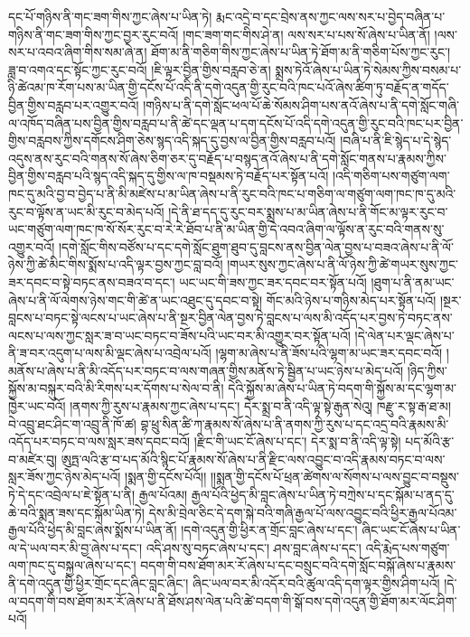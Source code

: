 དང་པོ་གཉིས་ནི་གང་ཟག་གིས་ཀྱང་ཞེས་པ་ཡིན་ཏེ། རྨང་འདྲེ་བ་དང་བྲེས་ནས་ཀྱང་ལས་སར་པ་བྱེད་བཞིན་པ་གཉིས་ནི་གང་ཟག་གིས་ཀྱང་བྱར་རུང་བའོ། །གང་ཟག་གང་གིས་ཤེ་ན། ལས་སར་པ་པས་སོ་ཞེས་པ་ཡིན་ནོ། །ལས་སར་པ་འབའ་ཞིག་གིས་སམ་ཞེ་ན། ཐོག་མ་ནི་གཅིག་གིས་ཀྱང་ཞེས་པ་ཡིན་ཏེ་ཐོག་མ་ནི་གཅིག་པོས་ཀྱང་རུང་། ཟླ་བ་འགའ་དང་སྟོང་ཀྱང་རུང་བའོ། །ཇི་ལྟར་བྱིན་གྱིས་བརླབ་ཅེ་ན། སྨྲས་ཏེའོ་ཞེས་པ་ཡིན་ཏེ་སེམས་ཀྱིས་བསམ་པ་ཉི་ཚེའམ་ཁ་རོག་པས་མ་ཡིན་གྱི་དངོས་པོ་འདི་ནི་དགེ་འདུན་གྱི་རུང་བའི་ཁང་པའོ་ཞེས་ཚིག་ཏུ་བརྗོད་ན་གདོད་བྱིན་གྱིས་བརླབ་པར་འགྱུར་བའོ། །གཉིས་པ་ནི་དགེ་སློང་ཕལ་པོ་ཆེ་སོམས་ཤིག་པས་ནའོ་ཞེས་པ་ནི་དགེ་སློང་གཞི་ལ་འཁོད་བཞིན་པས་བྱིན་གྱིས་བརླབ་པ་ནི་ཚེ་དང་ལྡན་པ་དག་དངོས་པོ་འདི་དགེ་འདུན་གྱི་རུང་བའི་ཁང་པར་བྱིན་གྱིས་བརླབས་ཀྱིས་དགོངས་ཤིག་ཅེས་སྙད་འདི་སྐད་དུ་བྱས་ལ་བྱིན་གྱིས་བརླབ་པའོ། །བཞི་པ་ནི་ཇི་སྙེད་པ་དེ་སྙེད་འདུས་ནས་རུང་བའི་གནས་སོ་ཞེས་ཅིག་ཅར་དུ་བརྗོད་པ་བསྙད་ནའོ་ཞེས་པ་ནི་དགེ་སློང་གནས་པ་རྣམས་ཀྱིས་བྱིན་གྱིས་བརླབ་པའི་སྙད་འདི་སྐད་དུ་གྱིས་ལ་ཁ་བསྡམས་ཏེ་བརྗོད་པར་སྟོན་པའོ། །འདི་གཅིག་པས་གཙུག་ལག་ཁང་དུ་མའི་བྱ་བ་བྱེད་པ་ནི་མི་མཛེས་པ་མ་ཡིན་ཞེས་པ་ནི་རུང་བའི་ཁང་པ་གཅིག་ལ་གཙུག་ལག་ཁང་ཁ་དུ་མའི་རུང་བ་ལྟོས་ན་ཡང་མི་རུང་བ་མེད་པའོ། །དེ་ནི་ཐ་དད་དུ་རུང་བར་སྨྲས་པ་མ་ཡིན་ཞེས་པ་ནི་གོང་མ་ལྟར་རུང་བ་ཡང་གཙུག་ལག་ཁང་ཁ་སོ་སོར་རུང་བ་རེ་རེ་ཐོབ་པ་ནི་མ་ཡིན་གྱི་དེ་འབའ་ཞིག་ལ་ལྟོས་ན་རུང་བའི་གནས་སུ་འགྱུར་བའོ། །དགེ་སློང་གིས་བཙོས་པ་དང་དགེ་སློང་ཐུག་ཐུབ་དུ་བླངས་ནས་བྱིན་ལེན་བྱས་པ་བཟའ་ཞེས་པ་ནི་ལོ་ཉེས་ཀྱི་ཚེ་མིང་གིས་སྨོས་པ་འདི་ལྟར་བྱས་ཀྱང་བླ་བའོ། །གཡར་སུས་ཀྱང་ཞེས་པ་ནི་ལོ་ཉེས་ཀྱི་ཚེ་གཡར་སུས་ཀྱང་ཟར་དབང་བ་སྟེ་བཏང་ནས་བཟའ་བ་དང་། ཡང་ཡང་གི་ཟས་ཀྱང་ཟར་དབང་བར་སྟོན་པའོ། །ཐུག་པ་ནི་ནམ་ཡང་ཞེས་པ་ནི་ལོ་ལེགས་ཉེས་གང་གི་ཚེ་ན་ཡང་འཐུང་དུ་དབང་བ་སྟེ། གོང་མའི་ཉེས་པ་གཉིས་མེད་པར་སྟོན་པའོ། །སྔར་བླངས་པ་བཏང་སྟེ་ལངས་པ་ཡང་ཞེས་པ་ནི་སྔར་བྱིན་ལེན་བྱས་ཏེ་བླངས་པ་ལས་མི་འདོད་པར་བྱས་ཏེ་བཏང་ནས་ལངས་པ་ལས་ཀྱང་སླར་ཟ་བ་ཡང་བཏང་བ་ཟོས་པའི་ཡང་བར་མི་འགྱུར་བར་སྟོན་པའོ། །དེ་ལེན་པར་ལྡང་ཞེས་པ་ནི་ཟ་བར་འདུག་པ་ལས་མི་ལྡང་ཞེས་པ་འབྲེལ་པའོ། །ལྷག་མ་ཞེས་པ་ནི་ཟོས་པའི་ལྷག་མ་ཡང་ཟར་དབང་བའོ། །མནོས་པ་ཞེས་པ་ནི་མི་འདོད་པར་བཏང་བ་ལས་གཞན་གྱིས་མནོས་ཏེ་སྦྱིན་པ་ཡང་ཉེས་པ་མེད་པའོ། །ཉིད་ཀྱིས་སྐྱོས་མ་བསྐུར་བའི་མི་རིགས་པར་དོགས་པ་སེལ་བ་ནི། དེའི་སྐྱོས་མ་ཞེས་པ་ཡིན་ཏེ་བདག་གི་སྐྱོས་མ་དང་ལྷག་མ་ཁྱེར་ཡང་བའོ། །ནགས་ཀྱི་རུས་པ་རྣམས་ཀྱང་ཞེས་པ་དང་། དེར་སྨྲ་བ་ནི་འདི་ལྟ་སྟེ་རྒུན་སེའུ། ཁརྫུ་ར་སྟ་རྒ་ཐ་མ། བེ་འབྲུ་ཐང་ཤིང་ག་འབྲུ་ནི་ཁོ་ཚ། བྷ་ཕྲུ་སིན་ཚི་ཀ་རྣམས་སོ་ཞེས་པ་ནི་ནགས་ཀྱི་རུས་པ་དང་འདྲ་བའི་རྣམས་མི་འདོད་པར་བཏང་བ་ལས་སླར་ཟས་དབང་བའོ། །རྫིང་གི་ཡང་ངོ་ཞེས་པ་དང་། དེར་སྨ་བ་ནི་འདི་ལྟ་སྟེ། པད་མོའི་རྩ་བ་མཛེར་བུ། ཨུཏྤ་ལའི་རྩ་བ་པད་མོའི་སྙིང་པོ་རྣམས་སོ་ཞེས་པ་ནི་རྫིང་ལས་འབྱུང་བ་འདི་རྣམས་བཏང་བ་ལས་སླར་ཟོས་ཀྱང་ཉེས་མེད་པའོ། །སྨན་གྱི་དངོས་པོའོ།། །།སྨན་གྱི་དངོས་པོ་ཕྲན་ཚེགས་ལ་སོགས་པ་ལས་བྱུང་བ་བསྡུས་ཏེ་དེ་དང་འབྲེལ་པ་ཇེ་སྟོན་པ་ནི། རྒྱལ་པོའམ། རྒྱལ་པོའི་ཕྱེད་མི་བླང་ཞེས་པ་ཡིན་ཏེ་བཀྲེས་པ་དང་སྐོམ་པ་ནད་དུ་ཆེ་བའི་སྨན་ཟས་དང་སྐོམ་ཡིན་ཏེ། དེས་མི་བྲེལ་ཅིང་དེ་དག་སྐེ་བའི་གཞི་རྒྱལ་པོ་ལས་འབྱུང་བའི་ཕྱིར་རྒྱལ་པོའམ་རྒྱལ་པོའི་ཕྱེད་མི་བླང་ཞེས་སྨོས་པ་ཡིན་ནོ། །དགེ་འདུན་གྱི་ཕྱིར་ན་གྲོང་བླང་ཞེས་པ་དང་། ཞིང་ཡང་ངོ་ཞེས་པ་ཡིན་ལ་དེ་ཡལ་བར་མི་བྱ་ཞེས་པ་དང་། འདི་ཤས་སུ་བཏང་ཞེས་པ་དང་། ཤས་བླང་ཞེས་པ་དང་། འདི་རྨེད་པས་གཙུག་ལག་ཁང་དུ་བསྐྱལ་ཞེས་པ་དང་། བདག་གི་བས་ཐོག་མར་རོ་ཞེས་པ་དང་བསྲུང་བའི་དགེ་སློང་བསྐོ་ཞེས་པ་རྣམས་ནི་དགེ་འདུན་གྱི་ཕྱིར་གྲོང་དང་ཞིང་བླང་ཞིང་། ཞིང་ཡལ་བར་མི་འདོར་བའི་ཚུལ་འདི་དག་ལྟར་གྱིས་ཤིག་པའོ། །དེ་ལ་བདག་གི་བས་ཐོག་མར་རོ་ཞེས་པ་ནི་ཐོས་ཤས་ལེན་པའི་ཚེ་བདག་གི་སྒོ་བས་དགེ་འདུན་གྱི་ཐོག་མར་ལོང་ཤིག་པའོ། 